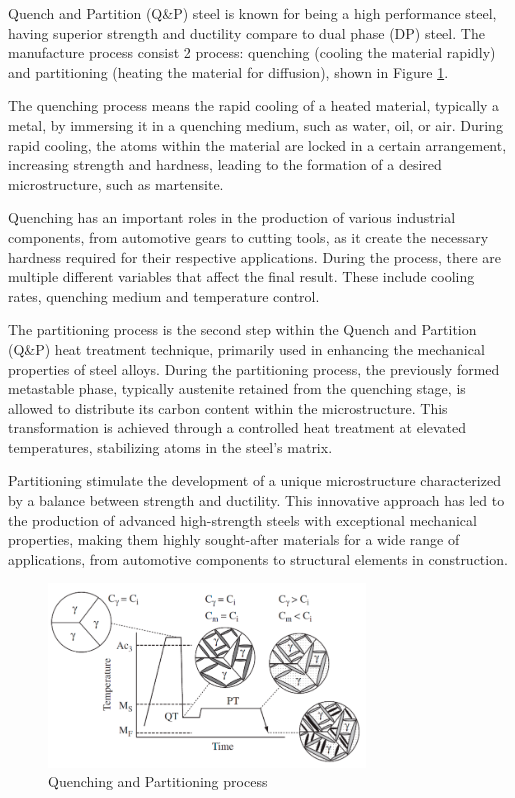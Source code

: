 Quench and Partition (Q\&P) steel is known for being a high performance steel, having superior strength and ductility compare to dual phase (DP) steel. The manufacture process consist 2 process: quenching (cooling the material rapidly) and partitioning (heating the material for diffusion), shown in Figure \ref{fig:QPprocess}.

The quenching process means the rapid cooling of a heated material, typically a metal, by immersing it in a quenching medium, such as water, oil, or air. During rapid cooling, the atoms within the material are locked in a certain arrangement, increasing strength and hardness, leading to the formation of a desired microstructure, such as martensite. 

Quenching has an important roles in the production of various industrial components, from automotive gears to cutting tools, as it create the necessary hardness  required for their respective applications. During the process, there are multiple different variables that affect the final result. These include cooling rates, quenching medium and temperature control.

The partitioning process is the second step within the Quench and Partition (Q\&P) heat treatment technique, primarily used in enhancing the mechanical properties of  steel alloys. During the partitioning process, the previously formed metastable phase, typically austenite retained from the quenching stage, is allowed to distribute its carbon content within the microstructure. This transformation is achieved through a controlled heat treatment at elevated temperatures, stabilizing atoms in the steel's matrix.

Partitioning stimulate the development of a unique microstructure characterized by a balance between strength and ductility. This innovative approach has led to the production of advanced high-strength steels with exceptional mechanical properties, making them highly sought-after materials for a wide range of applications, from automotive components to structural elements in construction. 

\begin{figure}[h!]
    \captionsetup{justification=centering,margin=2cm}
    \centering
    \includegraphics[width=0.75\textwidth]{Image/Q&P.png}
    \caption{Quenching and Partitioning process}
    \captionsetup{justification=centering,margin=2cm}
    \label{fig:QPprocess}
\end{figure}

